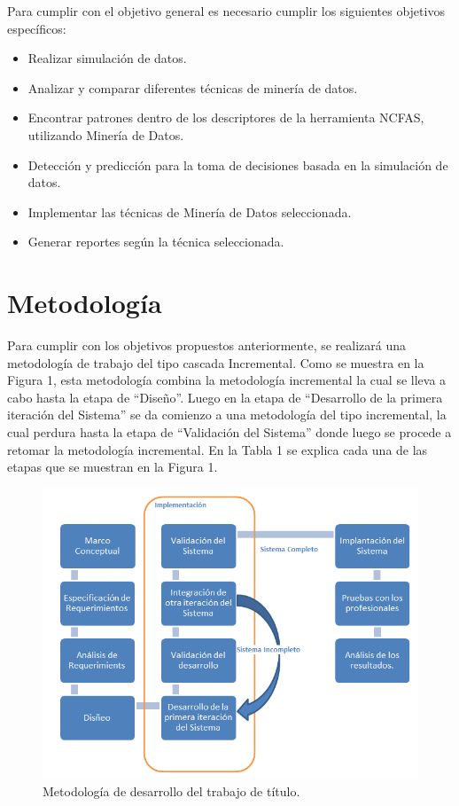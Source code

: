 \documentclass[12pt,letterpaper]{article}
\begin{document}
Para cumplir con el objetivo general es necesario cumplir los siguientes objetivos específicos:
\begin{itemize}

\item Realizar simulación de datos.

\item Analizar y comparar diferentes técnicas de minería de datos.
\item	Encontrar patrones dentro de los descriptores de la herramienta NCFAS, utilizando Minería de Datos. 
\item	Detección y predicción para la toma de decisiones basada en la simulación de datos. 
\item	Implementar las técnicas de Minería de Datos seleccionada. 
\item	Generar reportes según la técnica seleccionada. 

\end{itemize}

\newpage
\section{Metodolog\'ia}
\label{metod}

Para cumplir con los objetivos propuestos anteriormente, se realizará una metodología de trabajo del tipo cascada Incremental. 
Como se muestra en la Figura 1, esta metodología combina la metodología incremental la cual se lleva a cabo hasta la etapa de “Diseño”. Luego en la etapa de “Desarrollo de la primera iteración del Sistema” se da comienzo a una metodología del tipo incremental, la cual perdura hasta la etapa de “Validación del Sistema” donde luego se procede a retomar la metodología incremental.
En la Tabla 1 se explica cada una de las etapas que se muestran en la Figura 1.
%
\begin{figure}[htb]
\label{Figura 1}
\begin{center}
\includegraphics[scale=0.7]{metodologiaMV.png}
\end{center}
\caption{Metodolog\'ia de desarrollo del trabajo de t\'itulo.}
\end{figure}
%
\newpage
\clearpage
\end{document}
